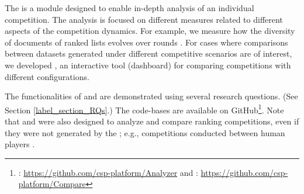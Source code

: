 The {\platformName} {\analyzer} is a module designed to enable in-depth analysis of an individual competition. The analysis is focused on different measures related to different aspects of the competition dynamics. For example, we measure how the diversity of documents of ranked lists evolves over rounds \cite{mordo_search_2025}.
For cases where comparisons between datasets generated under different competitive scenarios are of interest, we developed {\platformName} {\compare}, an interactive tool (dashboard) for comparing competitions with different configurations.

The functionalities of {\platformName} {\analyzer} and {\platformName} {\compare} are demonstrated using several research questions. (See Section \ref{label_section_RQs}.) The code-bases are available on GitHub\footnote{{\platformName} {\analyzer}: \url{https://github.com/csp-platform/Analyzer} and {\platformName} {\compare}: \url{https://github.com/csp-platform/Compare}}. Note that {\platformName} {\analyzer} and {\platformName} {\compare} were also designed to analyze and compare ranking competitions, even if they were not generated by the {\platformName} {\platform}; e.g., competitions conducted between human players \cite{raifer_information_2017, goren_driving_2021, nachimovsky_ranking-incentivized_2024}.